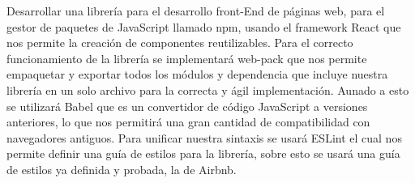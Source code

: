 Desarrollar una librería para el desarrollo front-End de páginas web, para el gestor de paquetes de JavaScript \cite{javascript} llamado npm, usando el framework React que nos permite la creación de componentes reutilizables. Para el correcto funcionamiento de la librería se implementará web-pack que nos permite empaquetar y exportar todos los módulos y dependencia que incluye nuestra librería en un solo archivo para la correcta y ágil implementación. Aunado a esto se utilizará Babel \cite{babel} que es un convertidor de código JavaScript a versiones anteriores, lo que nos permitirá una gran cantidad de compatibilidad con navegadores antiguos. Para unificar nuestra sintaxis se usará ESLint el cual nos permite definir una guía de estilos para la librería, sobre esto se usará una guía de estilos ya definida y probada, la de Airbnb. 
\newpage

